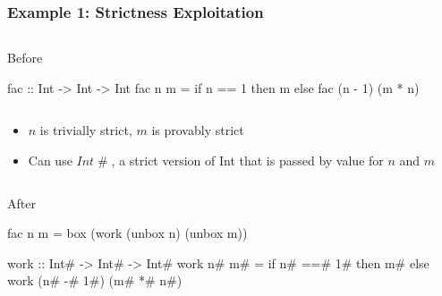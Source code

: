 \documentclass[smaller]{beamer}
\newcommand{\Conid}[1]{\mathit{#1}}
\newcommand{\Varid}[1]{\mathit{#1}}
\begin{document}
\begin{frame}[fragile]
\frametitle{Example 1: Strictness Exploitation}

\begin{columns}[t] 
\begin{column}{0.8\textwidth}
\begin{block}{Before}
{\footnotesize\begin{semiverbatim}
\alert{fac :: Int -> Int -> Int}
fac n m = if n == 1 
          then m 
          else fac (n - 1) (m * n) 
\end{semiverbatim}}
\end{block}
\end{column}
\end{columns}

\vskip 0.2in
\begin{itemize}
\item \ensuremath{\Varid{n}} is trivially strict, \ensuremath{\Varid{m}} is provably strict
\item Can use \ensuremath{\Conid{Int}\mathbin{\#}}, a strict version of Int that is passed by value for \ensuremath{\Varid{n}} and \ensuremath{\Varid{m}}
\end{itemize}
\begin{columns}[t] 
\begin{column}{0.8\textwidth}
\begin{block}{After}
{\footnotesize\begin{semiverbatim}
fac n m = box (work (unbox n) (unbox m))

\alert{work :: Int# -> Int# -> Int#}
work n# m# = if n# ==# 1# 
            then m# 
            else work (n# -# 1#) (m# *# n#) 
\end{semiverbatim}}
\end{block}
\end{column}
\end{columns}

\end{frame}
\end{document}
